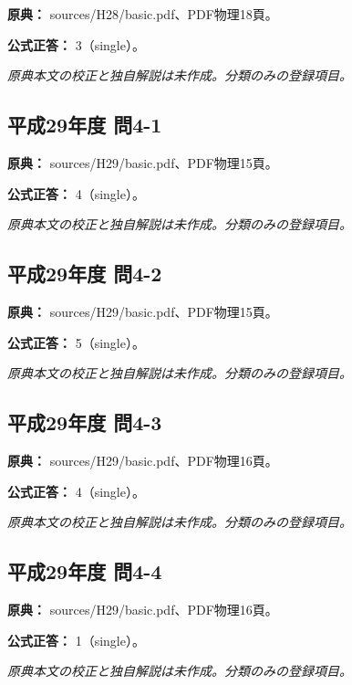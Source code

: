 \noindent\textbf{原典：} sources/H28/basic.pdf、PDF物理18頁。

\textbf{公式正答：} 3（single）。

\par\textit{原典本文の校正と独自解説は未作成。分類のみの登録項目。}

\subsection{平成29年度 問4-1}
\label{q:h29-reg-basic-4-1}

\noindent\textbf{原典：} sources/H29/basic.pdf、PDF物理15頁。

\textbf{公式正答：} 4（single）。

\par\textit{原典本文の校正と独自解説は未作成。分類のみの登録項目。}

\subsection{平成29年度 問4-2}
\label{q:h29-reg-basic-4-2}

\noindent\textbf{原典：} sources/H29/basic.pdf、PDF物理15頁。

\textbf{公式正答：} 5（single）。

\par\textit{原典本文の校正と独自解説は未作成。分類のみの登録項目。}

\subsection{平成29年度 問4-3}
\label{q:h29-reg-basic-4-3}

\noindent\textbf{原典：} sources/H29/basic.pdf、PDF物理16頁。

\textbf{公式正答：} 4（single）。

\par\textit{原典本文の校正と独自解説は未作成。分類のみの登録項目。}

\subsection{平成29年度 問4-4}
\label{q:h29-reg-basic-4-4}

\noindent\textbf{原典：} sources/H29/basic.pdf、PDF物理16頁。

\textbf{公式正答：} 1（single）。

\par\textit{原典本文の校正と独自解説は未作成。分類のみの登録項目。}


